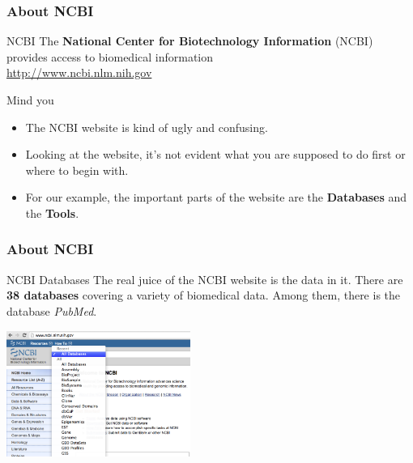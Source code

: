 \documentclass{beamer}\usepackage[]{graphicx}\usepackage[]{color}
\begin{document}

\begin{frame}
\frametitle{About NCBI}

\begin{block}{NCBI}
The \textbf{National Center for Biotechnology Information} (NCBI) provides access to biomedical information \\
{\scriptsize \url{http://www.ncbi.nlm.nih.gov}}
\end{block}

\begin{block}{Mind you}
\begin{itemize}
 \item The NCBI website is kind of ugly and confusing. \\
 \item Looking at the website, it's not evident what you are supposed to do first or where to begin with.
 \item For our example, the important parts of the website are the \textbf{Databases} and the \textbf{Tools}.
\end{itemize}
\end{block}

\end{frame}


\begin{frame}
\frametitle{About NCBI}

\begin{block}{NCBI Databases}
The real juice of the NCBI website is the data in it. There are \textbf{38 databases} covering a variety of biomedical data. Among them, there is the database \textit{PubMed}.
\end{block}

\begin{center}
\includegraphics[width=6cm]{images/ncbi_databases.png}
\end{center}

\end{frame}
\end{document}
